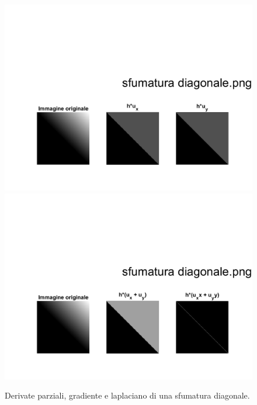 \newpage
\begin{figure}[htb] 
\centering
\includegraphics[scale=0.4, trim = 0 0 0 10.5cm, clip]{Pictures/Risultati/sfumatura diagonale bianco e nero derivate parziali.png}
\includegraphics[scale=0.4, trim = 0 0 0 10.5cm, clip]{Pictures/Risultati/sfumatura diagonale bianco e nero gradiente e laplaciano.png}
\caption{Derivate parziali, gradiente e laplaciano di una sfumatura diagonale.}\label{fig:figura}
\end{figure}

